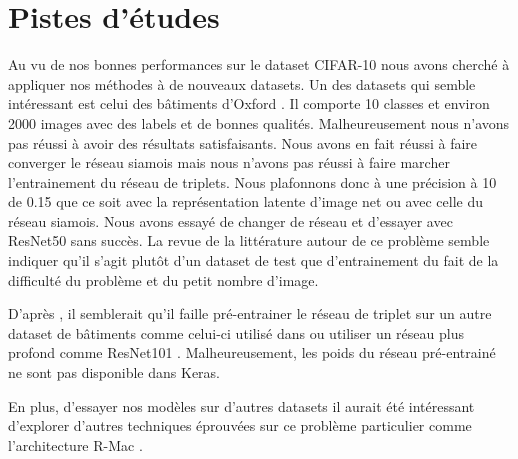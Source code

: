 \section{Pistes d'études}

Au vu de nos bonnes performances sur le dataset CIFAR-10 nous avons cherché à appliquer nos méthodes à de nouveaux
datasets. Un des datasets qui semble intéressant est celui des bâtiments
d’Oxford \cite{object2007philbin}. Il comporte 10 classes et environ 2000 images avec des
labels et de bonnes qualités. Malheureusement nous n’avons pas réussi à avoir des résultats satisfaisants. Nous avons en
fait réussi à faire converger le réseau siamois mais nous n’avons pas réussi à faire marcher l’entrainement du réseau de
triplets. Nous plafonnons donc à une précision à 10 de 0.15 que ce soit avec la représentation latente d’image net ou
avec celle du réseau siamois. Nous avons essayé de changer de réseau et d’essayer avec ResNet50 sans succès. La revue de
la littérature autour de ce problème semble indiquer qu’il s’agit plutôt d’un dataset de test que d’entrainement du fait
de la difficulté du problème et du petit nombre d’image.

D’après \cite{end2017gordo}, il semblerait qu’il faille pré-entrainer le réseau de triplet sur un autre dataset de
bâtiments comme celui-ci utilisé dans \cite{neural2014babenko}  ou utiliser un réseau plus profond comme ResNet101
\cite{deep2015he}. Malheureusement, les poids du réseau pré-entrainé ne sont pas disponible dans Keras.

En plus, d’essayer nos modèles sur d’autres datasets il aurait été intéressant d’explorer d’autres techniques éprouvées
sur ce problème particulier comme l’architecture R-Mac \cite{particular2015tolias}.

